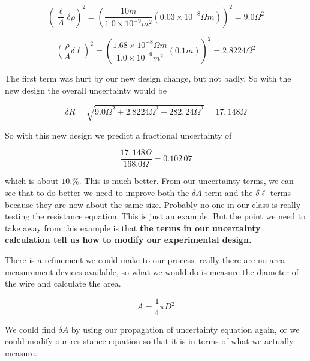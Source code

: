 \begin{equation*}
	\left( \frac{\ell }{A}\delta \rho \right) ^{2}=\left( \frac{10\unit{m}}{		1.0\times 10^{-9}\unit{m}^{2}}\left( 0.03\times 10^{-8}\unit{\Omega}\unit{m}\right) \right) ^{2}=9.0\unit{\Omega}^{2}
\end{equation*}

\begin{equation*}
	\left( \frac{\rho }{A}\delta \ell \right) ^{2}=\left( \frac{1.68\times
		10^{-8}\unit{\Omega}\unit{m}}{1.0\times 10^{-9}\unit{m}^{2}}\left( 0.1\unit{m}\right) \right)^{2}=2.8224\unit{\Omega}^{2}
\end{equation*}

The first term was hurt by our new design change, but not badly. So with the new design the overall uncertainty would be 

\begin{equation*}
	\delta R=\sqrt{9.0\unit{\Omega}^{2}+2.8224\unit{\Omega}^{2}+282.\,\allowbreak 24\unit{\Omega		}^{2}}=17.\,\allowbreak 148\unit{\Omega}
\end{equation*}

\noindent So with this new design we predict a fractional uncertainty of

\begin{equation*}
	\frac{17.\,\allowbreak 148\unit{\Omega}}{168.0\unit{\Omega	}}=0.102\,07
\end{equation*}

which is about $\allowbreak 10.\%.$ This is much better. From our uncertainty terms, we can see that to do better we need to improve both the $\delta A$ term and the $\delta \ell $ terms because they are now about the same size. Probably no one in our class is really testing the resistance equation. This is just an example. But the point we need to take away from this example is that \textbf{the terms in our uncertainty calculation tell us how to modify our experimental design.}

There is a refinement we could make to our process. really there are no area measurement devices available, so what we would do is measure the diameter of the wire and calculate the area.

\begin{equation*}
	A=\frac{1}{4}\pi D^{2}
\end{equation*}

We could find $\delta A$ by using our propagation of uncertainty equation again, or we could modify our resistance equation so that it is in terms of what we actually measure.

